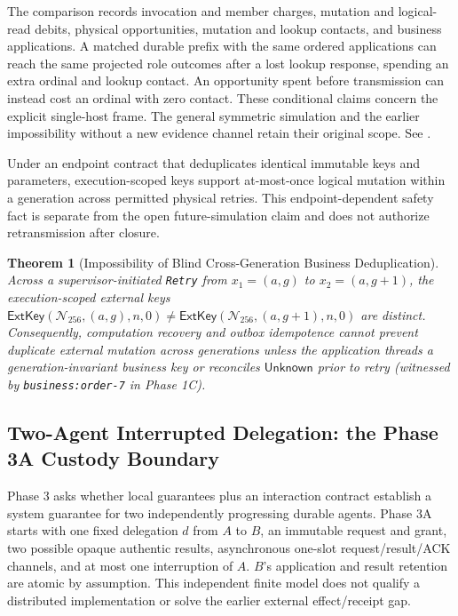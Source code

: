 \documentclass[11pt,a4paper]{article}
\newtheorem{theorem}{Theorem}[section]
\theoremstyle{definition}
\theoremstyle{remark}
\begin{document}
The comparison records invocation and member charges, mutation and logical-read debits, physical opportunities, mutation and lookup contacts, and business applications. A matched durable prefix with the same ordered applications can reach the same projected role outcomes after a lost lookup response, spending an extra ordinal and lookup contact. An opportunity spent before transmission can instead cost an ordinal with zero contact. These conditional claims concern the explicit single-host frame. The general symmetric simulation and the earlier impossibility without a new evidence channel retain their original scope. See .

Under an endpoint contract that deduplicates identical immutable keys and parameters, execution-scoped keys support at-most-once logical mutation within a generation across permitted physical retries. This endpoint-dependent safety fact is separate from the open future-simulation claim and does not authorize retransmission after closure.

\begin{theorem}[Impossibility of Blind Cross-Generation Business Deduplication]
\label{thm:crossgen}
Across a supervisor-initiated \texttt{Retry} from $x_1 = (a, g)$ to $x_2 = (a, g+1)$, the execution-scoped external keys $\mathsf{ExtKey}(\mathcal{N}_{256}, (a, g), n, 0) \ne \mathsf{ExtKey}(\mathcal{N}_{256}, (a, g+1), n, 0)$ are distinct. Consequently, computation recovery and outbox idempotence cannot prevent duplicate external mutation across generations unless the application threads a generation-invariant business key or reconciles $\mathsf{Unknown}$ prior to retry (witnessed by \texttt{business:order-7} in Phase 1C).
\end{theorem}

\subsection{Two-Agent Interrupted Delegation: the Phase 3A Custody Boundary}

Phase 3 asks whether local guarantees plus an interaction contract establish a system guarantee for two independently progressing durable agents. Phase 3A starts with one fixed delegation $d$ from $A$ to $B$, an immutable request and grant, two possible opaque authentic results, asynchronous one-slot request/result/ACK channels, and at most one interruption of $A$. $B$'s application and result retention are atomic by assumption. This independent finite model does not qualify a distributed implementation or solve the earlier external effect/receipt gap.
\end{document}
